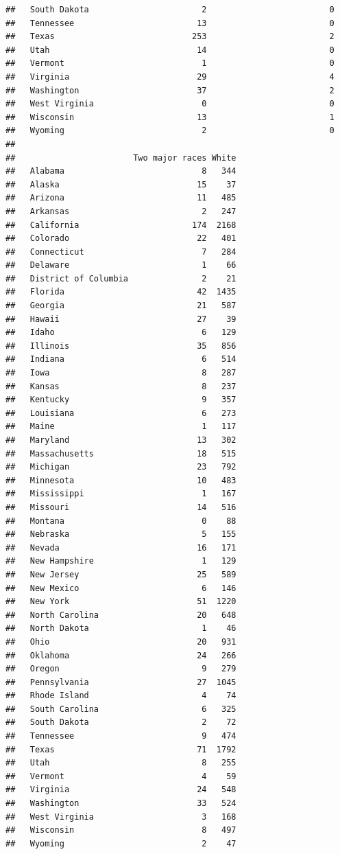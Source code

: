 \documentclass[]{book}
\theoremstyle{definition}
\theoremstyle{definition}
\theoremstyle{definition}
\theoremstyle{remark}
\begin{document}
\begin{verbatim}
##   South Dakota                       2                         0
##   Tennessee                         13                         0
##   Texas                            253                         2
##   Utah                              14                         0
##   Vermont                            1                         0
##   Virginia                          29                         4
##   Washington                        37                         2
##   West Virginia                      0                         0
##   Wisconsin                         13                         1
##   Wyoming                            2                         0
##                       
##                        Two major races White
##   Alabama                            8   344
##   Alaska                            15    37
##   Arizona                           11   485
##   Arkansas                           2   247
##   California                       174  2168
##   Colorado                          22   401
##   Connecticut                        7   284
##   Delaware                           1    66
##   District of Columbia               2    21
##   Florida                           42  1435
##   Georgia                           21   587
##   Hawaii                            27    39
##   Idaho                              6   129
##   Illinois                          35   856
##   Indiana                            6   514
##   Iowa                               8   287
##   Kansas                             8   237
##   Kentucky                           9   357
##   Louisiana                          6   273
##   Maine                              1   117
##   Maryland                          13   302
##   Massachusetts                     18   515
##   Michigan                          23   792
##   Minnesota                         10   483
##   Mississippi                        1   167
##   Missouri                          14   516
##   Montana                            0    88
##   Nebraska                           5   155
##   Nevada                            16   171
##   New Hampshire                      1   129
##   New Jersey                        25   589
##   New Mexico                         6   146
##   New York                          51  1220
##   North Carolina                    20   648
##   North Dakota                       1    46
##   Ohio                              20   931
##   Oklahoma                          24   266
##   Oregon                             9   279
##   Pennsylvania                      27  1045
##   Rhode Island                       4    74
##   South Carolina                     6   325
##   South Dakota                       2    72
##   Tennessee                          9   474
##   Texas                             71  1792
##   Utah                               8   255
##   Vermont                            4    59
##   Virginia                          24   548
##   Washington                        33   524
##   West Virginia                      3   168
##   Wisconsin                          8   497
##   Wyoming                            2    47
\end{verbatim}
\end{document}
